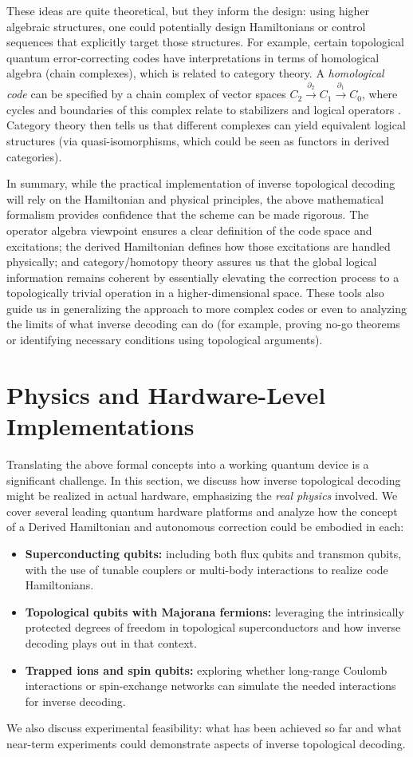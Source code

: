 \documentclass[11pt]{article}
\begin{document}
These ideas are quite theoretical, but they inform the design: using higher algebraic structures, one could potentially design Hamiltonians or control sequences that explicitly target those structures. For example, certain topological quantum error-correcting codes have interpretations in terms of homological algebra (chain complexes), which is related to category theory. A \emph{homological code} can be specified by a chain complex of vector spaces $C_2 \xrightarrow{\partial_2} C_1 \xrightarrow{\partial_1} C_0$, where cycles and boundaries of this complex relate to stabilizers and logical operators \cite{Bombin2007}. Category theory then tells us that different complexes can yield equivalent logical structures (via quasi-isomorphisms, which could be seen as functors in derived categories).

In summary, while the practical implementation of inverse topological decoding will rely on the Hamiltonian and physical principles, the above mathematical formalism provides confidence that the scheme can be made rigorous. The operator algebra viewpoint ensures a clear definition of the code space and excitations; the derived Hamiltonian defines how those excitations are handled physically; and category/homotopy theory assures us that the global logical information remains coherent by essentially elevating the correction process to a topologically trivial operation in a higher-dimensional space. These tools also guide us in generalizing the approach to more complex codes or even to analyzing the limits of what inverse decoding can do (for example, proving no-go theorems or identifying necessary conditions using topological arguments).

\section{Physics and Hardware-Level Implementations}
Translating the above formal concepts into a working quantum device is a significant challenge. In this section, we discuss how inverse topological decoding might be realized in actual hardware, emphasizing the \textit{real physics} involved. We cover several leading quantum hardware platforms and analyze how the concept of a Derived Hamiltonian and autonomous correction could be embodied in each:
\begin{itemize}
    \item \textbf{Superconducting qubits:} including both flux qubits and transmon qubits, with the use of tunable couplers or multi-body interactions to realize code Hamiltonians.
    \item \textbf{Topological qubits with Majorana fermions:} leveraging the intrinsically protected degrees of freedom in topological superconductors and how inverse decoding plays out in that context.
    \item \textbf{Trapped ions and spin qubits:} exploring whether long-range Coulomb interactions or spin-exchange networks can simulate the needed interactions for inverse decoding.
\end{itemize}
We also discuss experimental feasibility: what has been achieved so far and what near-term experiments could demonstrate aspects of inverse topological decoding.
\end{document}

